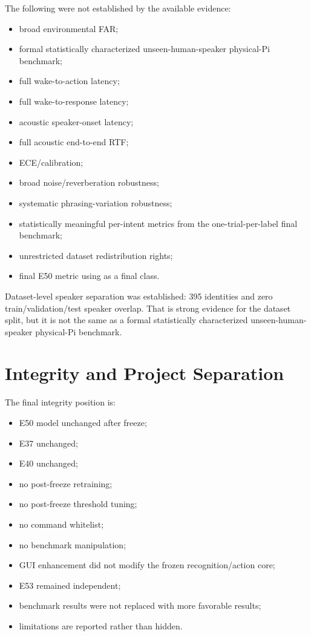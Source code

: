 \documentclass[11pt]{article}
\newcommand{\code}[1]{\texttt{\detokenize{#1}}}
\begin{document}
The following were not established by the available evidence:

\begin{itemize}
\item broad environmental FAR;
\item formal statistically characterized unseen-human-speaker physical-Pi benchmark;
\item full wake-to-action latency;
\item full wake-to-response latency;
\item acoustic speaker-onset latency;
\item full acoustic end-to-end RTF;
\item ECE/calibration;
\item broad noise/reverberation robustness;
\item systematic phrasing-variation robustness;
\item statistically meaningful per-intent metrics from the one-trial-per-label final benchmark;
\item unrestricted dataset redistribution rights;
\item final E50 metric using \code{COLOR} as a final class.
\end{itemize}

Dataset-level speaker separation was established: 395 identities and zero train/validation/test speaker overlap. That is strong evidence for the dataset split, but it is not the same as a formal statistically characterized unseen-human-speaker physical-Pi benchmark.

\section{Integrity and Project Separation}

The final integrity position is:

\begin{itemize}
\item E50 model unchanged after freeze;
\item E37 unchanged;
\item E40 unchanged;
\item no post-freeze retraining;
\item no post-freeze threshold tuning;
\item no command whitelist;
\item no benchmark manipulation;
\item GUI enhancement did not modify the frozen recognition/action core;
\item E53 remained independent;
\item benchmark results were not replaced with more favorable results;
\item limitations are reported rather than hidden.
\end{itemize}
\end{document}
